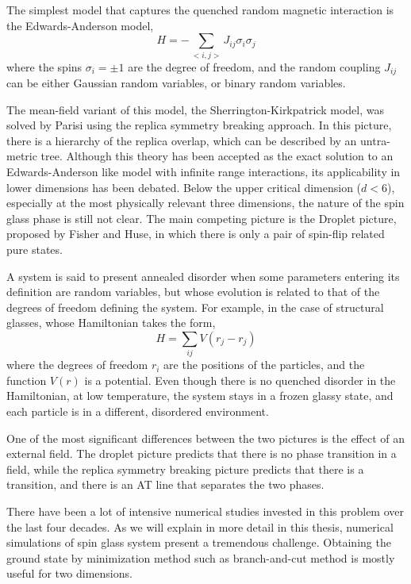 The simplest model that captures the quenched random magnetic interaction
is the Edwards-Anderson model,
\begin{equation}
  \label{eq:11}
  H=-\sum_{<i,j>}J_{ij}\sigma_i\sigma_j
\end{equation}
where the spins $\sigma_i=\pm 1$ are the degree of freedom, and the random coupling
$J_{ij}$ can be either Gaussian random variables, or binary random variables.

The mean-field variant of this model, the Sherrington-Kirkpatrick model, was
solved by Parisi using the replica symmetry breaking approach. In this picture,
there is a hierarchy of the replica overlap, which can be described by an untra-metric
tree. Although this theory has been accepted as the exact solution to an Edwards-Anderson
like model with infinite range interactions, its applicability in lower dimensions 
has been debated. Below the upper critical dimension ($d<6$), especially at the most
physically relevant three dimensions, the nature of the spin glass phase is still not clear. 
The main competing picture is the Droplet picture, proposed by Fisher and Huse, in which 
there is only a pair of spin-flip related pure states.


A system is said to present annealed disorder when some parameters entering 
its definition are random variables, but whose evolution is related to that 
of the degrees of freedom defining the system. For example, in the case of 
structural glasses, whose Hamiltonian takes the form,
\begin{equation}
  \label{eq:12}
  H=\sum_{ij}V(r_j-r_j)
\end{equation}
where the degrees of freedom $r_i$ are the positions of the particles, and the 
function $V(r)$ is a potential. Even though there is no quenched disorder in
the Hamiltonian, at low temperature, the system stays in a frozen glassy state, 
and each particle is in a different, disordered environment.

One of the most significant differences between the two pictures is the effect 
of an external field. The droplet picture predicts that there is no phase transition
in a field, while the replica symmetry breaking picture predicts that there is a 
transition, and there is an AT line that separates the two phases. 

There have been a lot of intensive numerical studies invested in this problem over 
the last four decades. As we will explain in more detail in this thesis, numerical
simulations of spin glass system present a tremendous challenge. Obtaining the ground
state by minimization method such as branch-and-cut method is mostly useful for 
two dimensions. 

